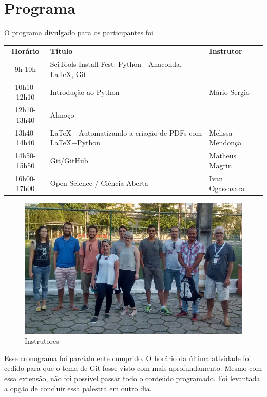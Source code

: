 \documentclass[12pt]{article}
\begin{document}
\newpage

\section*{Programa}

O programa divulgado para os participantes foi

\begin{tabular}{cp{}l}
  \textbf{Horário} & \textbf{Título} & \textbf{Instrutor} \\
  9h-10h & SciTools Install Fest: Python - Anaconda, LaTeX, Git & \\
  10h10-12h10 & Introdução ao Python & Mário Sergio \\
  12h10-13h40 & Almoço \\
  13h40-14h40 & LaTeX - Automatizando a criação de PDFs com LaTeX+Python & Melissa Mendonça \\
  14h50-15h50 & Git/GitHub & Matheus Magrin \\
  16h00-17h00 & Open Science / Ciência Aberta & Ivan Ogassavara \\
\end{tabular}

\begin{figure}[!htb]
\includegraphics[width=\textwidth]{../../media/photos/pre4-cut}
\caption{Instrutores}
\end{figure}

Esse cronograma foi parcialmente cumprido. O horário da última atividade foi cedido para que o tema
de Git fosse visto com mais aprofundamento. Mesmo com essa extensão, não foi possível passar todo o
conteúdo programado. Foi levantada a opção de concluir essa palestra em outro dia.
\end{document}
